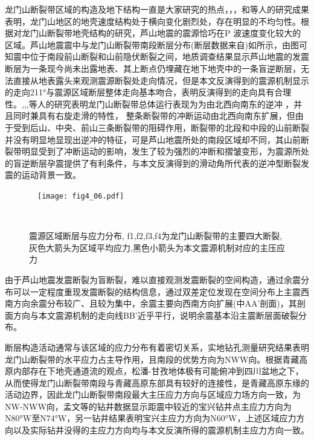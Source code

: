 龙门山断裂带区域的构造及地下结构一直是大家研究的热点，\citet{Zhang2013}，\citet{Wang2010}，和\citet{Zhang2011}等人的研究成果表明，龙门山地区的地壳速度结构处于横向变化剧烈处，存在明显的不均匀性。根据对龙门山断裂带地壳结构的研究，芦山地震的震源恰巧在P 波速度变化较大的区域。芦山地震震中与龙门山断裂带南段断层分布(断层数据来自)如所示，由图可知震中位于南段前山断裂和山前隐伏断裂之间，地质调查结果显示芦山地震的发震断层为一条现今尚未出露地表、其上断点仍埋藏在地下地壳中的一条盲逆断层，无法直接从地表露头来观测震源断裂处走向情况，但是本文反演得到的震源机制显示的走向211°与震源区域断层整体走向基本吻合，表明反演得到的走向具有合理性。,,\citet{Densmore2007},等人的研究表明龙门山断裂带总体运行表现为为由北西向南东的逆冲 ，并且同时兼具有右旋走滑的特性， 整条断裂带的冲断运动由北西向南东扩展，但由于受到后山、中央、前山三条断裂带的阻碍作用，断裂带的北段和中段的山前断裂并没有明显地显现出逆冲的特征，可是芦山地震所处的南段区域却不同，其山前断裂带明显受到了冲断运动的影响，发生了较为强烈的冲断和摺皱变形，为震源所处的盲逆断层孕震提供了有利条件，与本文反演得到的滑动角所代表的逆冲型断裂发震的运动背景一致。
\begin{figure}
\centering
  \texttt{[image: fig4\_06.pdf]}
  \caption{ 震源区域断层与应力分布, f1,f2,f3,f4为龙门山断裂带的主要四大断裂,灰色大箭头为区域平均应力,黑色小箭头为本文震源机制对应的主压应力}
  \label{fig4_06}
\end{figure}

由于芦山地震发震断裂为盲断裂，难以直接观测发震断裂的空间构造，通过余震分布可以一定程度重现发震断裂的结构信息，\citet{zhangguangwei2013}通过双差定位发现在空间分布上主震西南方向余震分布较广、且较为集中，余震主要向西南方向扩展(中AA'剖面)，其剖面方向与本文震源机制的走向线BB'近乎平行，说明余震基本沿主震断层面破裂分布。

断层构造活动通常与该区域的应力分布有着密切关系，实地钻孔测量研究结果表明龙门山断裂带的水平应力占主导作用，且南段的优势方向为NWW向。根据青藏高原内部存在下地壳通道流的观点\citep{Royden1997,Clark2000,Meng2005,Burchfiel1995,Harris2007}，松潘-甘孜地体极有可能俯冲到四川盆地之下，从而使得龙门山断裂带南段与青藏高原东部具有较好的连接性，是青藏高原东缘的活动边界，因此龙门山断裂带南段最大主压应力方向与区域应力场方向一致，为NW-NWW向，孟文等的钻井数据显示距震中较近的宝兴钻井点主应力方向为N80°W至N74°W，另一钻井结果表明宝兴主应力方向为N60°W，上述区域应力方向以及实际钻井没得的主应力方向均与本文反演所得的震源机制主应力方向一致。

